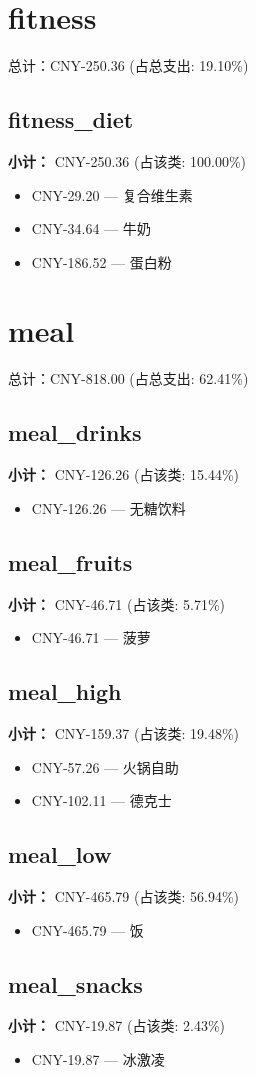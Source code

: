 \documentclass[12pt]{article}
\begin{document}
\section*{fitness}
总计：CNY-250.36 	 (占总支出: 19.10\%)

\subsection*{fitness\_diet}
\textbf{小计：} CNY-250.36 (占该类: 100.00\%)
\begin{itemize}
    \item CNY-29.20 --- 复合维生素
    \item CNY-34.64 --- 牛奶
    \item CNY-186.52 --- 蛋白粉
\end{itemize}
\section*{meal}
总计：CNY-818.00 	 (占总支出: 62.41\%)

\subsection*{meal\_drinks}
\textbf{小计：} CNY-126.26 (占该类: 15.44\%)
\begin{itemize}
    \item CNY-126.26 --- 无糖饮料
\end{itemize}
\subsection*{meal\_fruits}
\textbf{小计：} CNY-46.71 (占该类: 5.71\%)
\begin{itemize}
    \item CNY-46.71 --- 菠萝
\end{itemize}
\subsection*{meal\_high}
\textbf{小计：} CNY-159.37 (占该类: 19.48\%)
\begin{itemize}
    \item CNY-57.26 --- 火锅自助
    \item CNY-102.11 --- 德克士
\end{itemize}
\subsection*{meal\_low}
\textbf{小计：} CNY-465.79 (占该类: 56.94\%)
\begin{itemize}
    \item CNY-465.79 --- 饭
\end{itemize}
\subsection*{meal\_snacks}
\textbf{小计：} CNY-19.87 (占该类: 2.43\%)
\begin{itemize}
    \item CNY-19.87 --- 冰激凌
\end{itemize}
\end{document}
